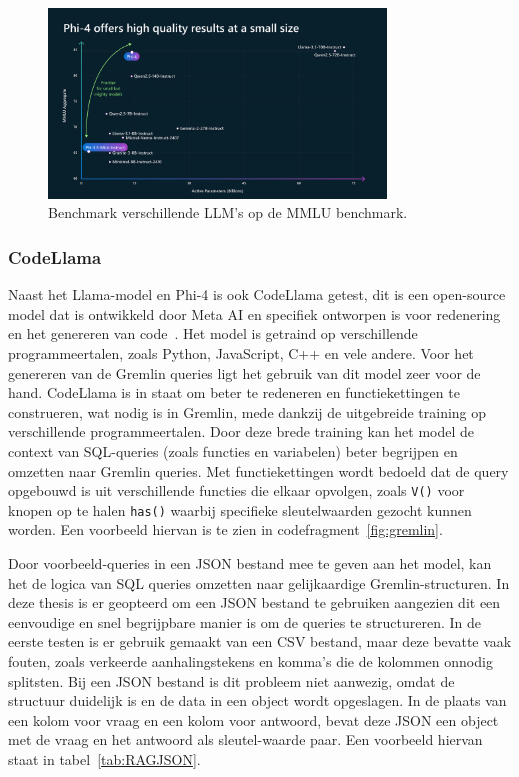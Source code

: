 \begin{figure}[H]
     \centering
     \includegraphics[width=0.8\textwidth]{./img/MMLU.png}
     \caption[benchmark LLMs.]{\label{fig:MMLU}Benchmark verschillende LLM's op de MMLU benchmark.}
\end{figure}

\subsubsection{CodeLlama}
Naast het Llama-model en Phi-4 is ook CodeLlama getest, dit is een open-source model dat is ontwikkeld door Meta AI en specifiek ontworpen is voor redenering en het genereren van code~\autocite{codellama}.
Het model is getraind op verschillende programmeertalen, zoals Python, JavaScript, C++ en vele andere. Voor het genereren van de Gremlin queries ligt het gebruik van dit model zeer voor de hand.
CodeLlama is in staat om beter te redeneren en functiekettingen te construeren, wat nodig is in Gremlin, mede dankzij de uitgebreide training op verschillende programmeertalen.\@
Door deze brede training kan het model de context van SQL-queries (zoals functies en variabelen) beter begrijpen en omzetten naar Gremlin queries.
Met functiekettingen wordt bedoeld dat de query opgebouwd is uit verschillende functies die elkaar opvolgen, zoals \texttt{V()} voor knopen op te halen \texttt{has()} waarbij specifieke sleutelwaarden gezocht kunnen worden.
Een voorbeeld hiervan is te zien in codefragment~\ref{fig:gremlin}.

Door voorbeeld-queries in een JSON bestand mee te geven aan het model, kan het de logica van SQL queries omzetten naar gelijkaardige Gremlin-structuren.
In deze thesis is er geopteerd om een JSON bestand te gebruiken aangezien dit een eenvoudige en snel begrijpbare manier is om de queries te structureren.
In de eerste testen is er gebruik gemaakt van een CSV bestand, maar deze bevatte vaak fouten, zoals verkeerde aanhalingstekens en komma's die de kolommen onnodig splitsten.
Bij een JSON bestand is dit probleem niet aanwezig, omdat de structuur duidelijk is en de data in een object wordt opgeslagen.
In de plaats van een kolom voor vraag en een kolom voor antwoord, bevat deze JSON een object met de vraag en het antwoord als sleutel-waarde paar.
Een voorbeeld hiervan staat in tabel~\ref{tab:RAGJSON}.

